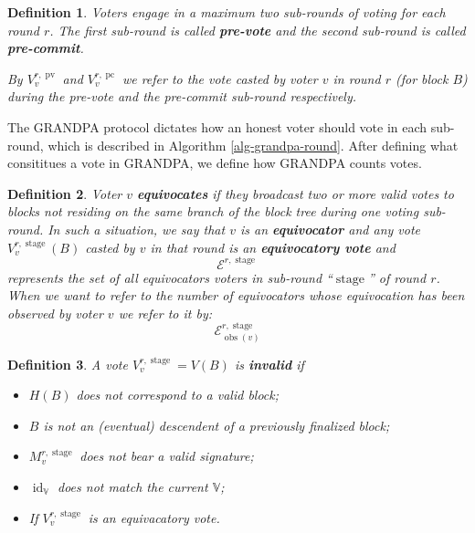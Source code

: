 \documentclass{article}
\newcommand{\tmop}[1]{\ensuremath{\operatorname{#1}}}
\newcommand{\tmstrong}[1]{\textbf{#1}}
\newcommand{\tmtextbf}[1]{{\bfseries{#1}}}
\newenvironment{itemizedot}{\begin{itemize} \renewcommand{\labelitemi}{$\bullet$}\renewcommand{\labelitemii}{$\bullet$}\renewcommand{\labelitemiii}{$\bullet$}\renewcommand{\labelitemiv}{$\bullet$}}{\end{itemize}}
\newtheorem{definition}{Definition}
\providecommand{\tmop}[1]{\ensuremath{\mathrm{#1}}}
\providecommand{\tmstrong}[1]{\tmtextbf{#1}}
\providecommand{\tmtextbf}[1]{\tmtextbf{#1}}
\newtheorem{definition}{Definition}
\begin{document}
\begin{definition}
  Voters engage in a maximum two sub-rounds of voting for each round $r$. The
  first sub-round is called {\tmstrong{pre-vote}} and the second sub-round is
  called {\tmstrong{pre-commit}}.
  
  By {\tmstrong{$V_v^{r, \tmop{pv}}$}} and {\tmstrong{$V_v^{r, \tmop{pc}}$}}
  we refer to the vote casted by voter $v$ in round $r$ (for block $B$) during
  the pre-vote and the pre-commit sub-round respectively.
\end{definition}

The GRANDPA protocol dictates how an honest voter should vote in each
sub-round, which is described in Algorithm \ref{alg-grandpa-round}. After
defining what consititues a vote in GRANDPA, we define how GRANDPA counts
votes.

\begin{definition}
  Voter $v$ {\tmstrong{equivocates}} if they broadcast two or more valid votes
  to blocks not residing on the same branch of the block tree during one
  voting sub-round. In such a situation, we say that $v$ is an
  {\tmstrong{equivocator}} and any vote $V_v^{r, \tmop{stage}} (B)$ casted by
  $v$ in that round is an {\tmstrong{equivocatory vote}} and
  \[ \mathcal{E}^{r, \tmop{stage}} \]
  represents the set of all equivocators voters in sub-round
  ``$\tmop{stage}$'' of round $r$. When we want to refer to the number of
  equivocators whose equivocation has been observed by voter $v$ we refer to
  it by:
  \[ \mathcal{E}^{r, \tmop{stage}}_{\tmop{obs} (v)} \]
  
\end{definition}

\begin{definition}
  A vote $V_v^{r, \tmop{stage}} = V (B)$ is {\tmstrong{invalid}} if
  \begin{itemize}
    \begin{itemizedot}
      \item $H (B)$ does not correspond to a valid block;
      
      \item $B$ is not an (eventual) descendent of a previously finalized
      block;
      
      \item $M^{r, \tmop{stage}}_v$ does not bear a valid signature;
      
      \item $\tmop{id}_{\mathbb{V}}$ does not match the current $\mathbb{V}$;
      
      \item If $V_v^{r, \tmop{stage}}$ is an equivacatory vote.
    \end{itemizedot}
  \end{itemize}
\end{definition}
\end{document}
